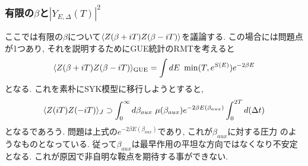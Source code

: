 \subsubsection{有限の$\beta$と$|Y_{E,\Delta}(T)|^2$}
ここでは有限の$\beta$について$\langle Z(\beta + iT)Z(\beta - iT) \rangle$を議論する. 
この場合には問題点が1つあり, それを説明するためにGUE統計のRMTを考えると
\begin{align}
	\langle Z(\beta + iT)Z(\beta - iT) \rangle_{\mathrm{GUE}}
	=\int dE\ \min(T, e^{S(E)})e^{-2\beta E}
\end{align}
となる. 
これを素朴にSYK模型に移行しようとすると, 
\begin{align}
	\langle Z(iT)Z(-iT) \rangle_J \supset
	\int_0^{\infty}d\beta_{aux}\ \mu(\beta_{aux})e^{-2\beta E(\beta_{aux})}
	\int_0^{2T} d(\Delta t)
\end{align}
となるであろう. 
問題は上式の$e^{-2\beta E(\beta_{aux})}$であり, これが$\beta_{aux}$に対する圧力
のようなものとなっている. 
従って$\beta_{aux}$は最早作用の平坦な方向ではなくなり不安定となる. 
これが原因で非自明な鞍点を期待する事ができない. 

